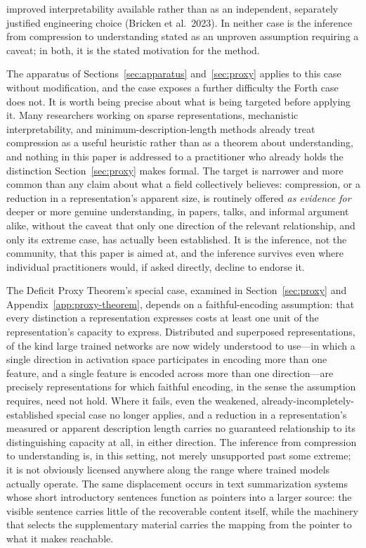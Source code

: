 \documentclass[11pt]{article}
\theoremstyle{plain}
\begin{document}
improved interpretability available rather than as an independent, separately justified engineering choice (Bricken et al.\ 2023). In neither case is the inference from compression to understanding stated as an unproven assumption requiring a caveat; in both, it is the stated motivation for the method.

The apparatus of Sections~\ref{sec:apparatus} and~\ref{sec:proxy} applies to this case without modification, and the case exposes a further difficulty the Forth case does not. It is worth being precise about what is being targeted before applying it. Many researchers working on sparse representations, mechanistic interpretability, and minimum-description-length methods already treat compression as a useful heuristic rather than as a theorem about understanding, and nothing in this paper is addressed to a practitioner who already holds the distinction Section~\ref{sec:proxy} makes formal. The target is narrower and more common than any claim about what a field collectively believes: compression, or a reduction in a representation's apparent size, is routinely offered \emph{as evidence for} deeper or more genuine understanding, in papers, talks, and informal argument alike, without the caveat that only one direction of the relevant relationship, and only its extreme case, has actually been established. It is the inference, not the community, that this paper is aimed at, and the inference survives even where individual practitioners would, if asked directly, decline to endorse it.

The Deficit Proxy Theorem's special case, examined in Section~\ref{sec:proxy} and Appendix~\ref{app:proxy-theorem}, depends on a faithful-encoding assumption: that every distinction a representation expresses costs at least one unit of the representation's capacity to express. Distributed and superposed representations, of the kind large trained networks are now widely understood to use---in which a single direction in activation space participates in encoding more than one feature, and a single feature is encoded across more than one direction---are precisely representations for which faithful encoding, in the sense the assumption requires, need not hold. Where it fails, even the weakened, already-incompletely-established special case no longer applies, and a reduction in a representation's measured or apparent description length carries no guaranteed relationship to its distinguishing capacity at all, in either direction. The inference from compression to understanding is, in this setting, not merely unsupported past some extreme; it is not obviously licensed anywhere along the range where trained models actually operate. The same displacement occurs in text summarization systems whose short introductory sentences function as pointers into a larger source: the visible sentence carries little of the recoverable content itself, while the machinery that selects the supplementary material carries the mapping from the pointer to what it makes reachable.
\end{document}
